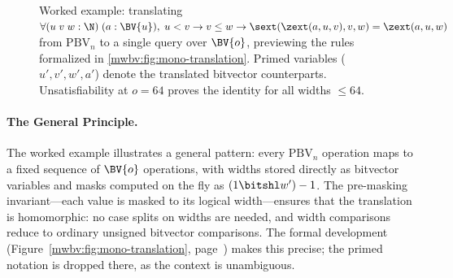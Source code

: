 \begin{figure}[htbp]
\footnotesize
{}
\caption{Worked example: translating
$\forall (u\;v\;w : \N)\;(a : \BV{u}),\;
u < v \to v \leq w \to \sext(\zext(a, u, v), v, w) = \zext(a, u, w)$
from $\text{PBV}_n$ to a single \qfbv{} query over $\BV{o}$,
previewing the rules formalized in \cref{mwbv:fig:mono-translation}.
Primed variables ($u', v', w', a'$) denote the translated bitvector counterparts.
Unsatisfiability at $o = 64$ proves the identity for all widths $\leq 64$.}
\label{mwbv:fig:worked-example}
\end{figure}

\paragraph{The General Principle.}
%
The worked example illustrates a general pattern: every $\text{PBV}_n$
operation maps to a fixed sequence of $\BV{o}$ operations, with widths stored
directly as bitvector variables and masks computed on the fly as
$(1 \bitshl w') - 1$.
The pre-masking invariant—each value is masked to its logical width—ensures that
the translation is homomorphic: no case splits on widths are needed, and width
comparisons reduce to ordinary unsigned bitvector comparisons. The formal
development (Figure~\ref{mwbv:fig:mono-translation},
page~\pageref{mwbv:fig:mono-translation}) makes this precise; the primed notation is
dropped there, as the context is unambiguous.

